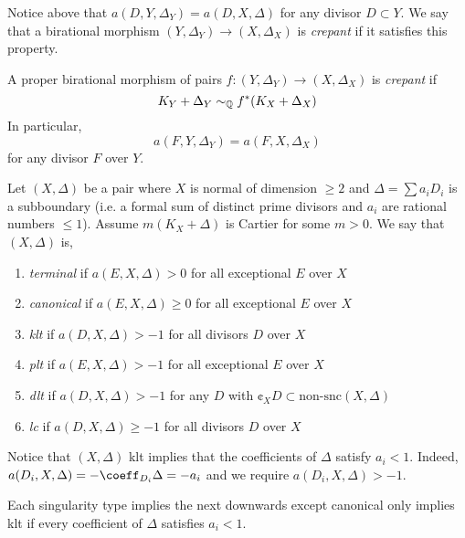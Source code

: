 \documentclass[12pt]{article}
\begin{document}
\begin{rmk}
Notice above that $a(D, Y, \Delta_Y) = a(D, X, \Delta)$ for any divisor $D \subset Y$. We say that a birational morphism $(Y, \Delta_Y) \to (X, \Delta_X)$ is \textit{crepant} if it satisfies this property. 
\end{rmk}


\begin{defn}
A proper birational morphism of pairs $f : (Y, \Delta_Y) \to (X, \Delta_X)$ is \textit{crepant} if 
\[ K_Y + \Delta_Y \sim_{\mathbb{Q}} f^* (K_X + \Delta_X) \]
In particular,
\[ a(F, Y, \Delta_Y) = a(F, X, \Delta_X) \]
for any divisor $F$ over $Y$. 
\end{defn}


\begin{defn}
Let $(X, \Delta)$ be a pair where $X$ is normal of dimension $\ge 2$ and $\Delta = \sum a_i D_i$ is a subboundary (i.e. a formal sum of distinct prime divisors and $a_i$ are rational numbers $\le 1$). Assume $m(K_X + \Delta)$ is Cartier for some $m > 0$. We say that $(X, \Delta)$ is,
\begin{enumerate}
\item \textit{terminal} if $a(E, X, \Delta) > 0$ for all exceptional $E$ over $X$
\item \textit{canonical} if $a(E, X, \Delta) \ge 0$ for all exceptional $E$ over $X$
\item \textit{klt} if $a(D, X, \Delta) > -1$ for all divisors $D$ over $X$
\item \textit{plt} if $a(E, X, \Delta) > -1$ for all exceptional $E$ over $X$
\item \textit{dlt} if $a(D, X, \Delta) > -1$ for any $D$ with $\cent_X D \subset \text{non-snc}(X, \Delta)$
\item \textit{lc} if $a(D, X, \Delta) \ge -1$ for all divisors $D$ over $X$
\end{enumerate}
\end{defn}

\begin{rmk}
Notice that $(X, \Delta)$ klt implies that the coefficients of $\Delta$ satisfy $a_i < 1$. Indeed, $a(D_i, X, \Delta) = - \coeff_{D_i} \Delta = - a_i$ and we require $a(D_i, X, \Delta) > - 1$. 
\end{rmk}

\begin{rmk}
Each singularity type implies the next downwards except canonical only implies klt if every coefficient of $\Delta$ satisfies $a_i < 1$. 
\end{rmk}
\end{document}
